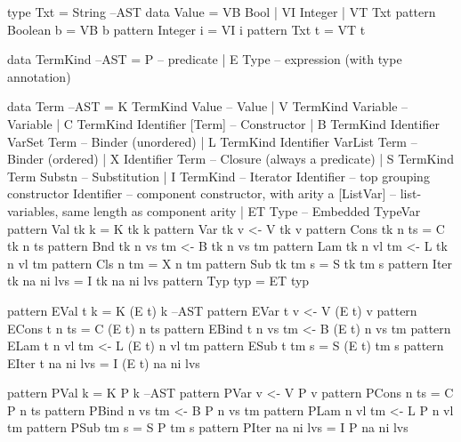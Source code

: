 \begin{code}
type Txt = String                                                        --AST
data Value
 = VB Bool
 | VI Integer
 | VT Txt
pattern Boolean b  =  VB b
pattern Integer i  =  VI i
pattern Txt     t  =  VT t
\end{code}

\begin{code}
data TermKind                                                            --AST
 = P -- predicate
 | E Type -- expression (with type annotation)
\end{code}

\begin{code}
data Term                                                                --AST
 = K TermKind Value                    -- Value
 | V TermKind Variable                 -- Variable
 | C TermKind Identifier [Term]        -- Constructor
 | B TermKind Identifier VarSet Term   -- Binder (unordered)
 | L TermKind Identifier VarList Term  -- Binder (ordered)
 | X Identifier Term                   -- Closure (always a predicate)
 | S TermKind Term Substn              -- Substitution
 | I TermKind                          -- Iterator
     Identifier  -- top grouping constructor
     Identifier  -- component constructor, with arity a
     [ListVar]   -- list-variables, same length as component arity
 | ET Type                              -- Embedded TypeVar
pattern Val  tk k          =   K tk k
pattern Var  tk v          <-  V tk v
pattern Cons tk n ts       =   C tk n ts
pattern Bnd  tk n vs tm    <-  B tk n vs tm
pattern Lam  tk n vl tm    <-  L tk n vl tm
pattern Cls     n    tm    =   X n tm
pattern Sub  tk tm s       =   S tk tm s
pattern Iter tk na ni lvs  =   I tk na ni lvs
pattern Typ  typ           =   ET typ
\end{code}


\begin{code}
pattern EVal t k           =  K (E t) k                                  --AST
pattern EVar t v          <-  V (E t) v
pattern ECons t n ts       =  C (E t) n ts
pattern EBind t n vs tm   <-  B (E t) n vs tm
pattern ELam t n vl tm    <-  L (E t) n vl tm
pattern ESub t tm s        =  S (E t) tm s
pattern EIter t na ni lvs  =  I (E t) na ni lvs
\end{code}

\begin{code}
pattern PVal k             =  K P k                                      --AST
pattern PVar v            <-  V P v
pattern PCons n ts         =  C P n ts
pattern PBind n vs tm     <-  B P n vs tm
pattern PLam n vl tm      <-  L P n vl tm
pattern PSub tm s          =  S P tm s
pattern PIter na ni lvs    =  I P na ni lvs
\end{code}

